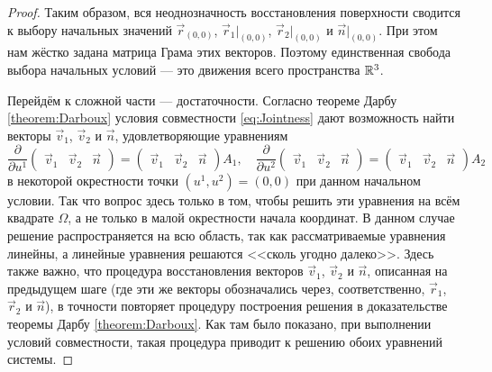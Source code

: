 \begin{proof}
	Таким образом, вся неоднозначность восстановления поверхности сводится к выбору начальных значений $\vec{r}_{(0, 0)}$, $\vec{r}_1|_{(0, 0)}$, $\vec{r}_2|_{(0, 0)}$ и $\vec{n}|_{(0, 0)}$. При этом нам жёстко задана матрица Грама этих векторов. Поэтому единственная свобода выбора начальных условий --- это движения всего пространства $\mathbb{R}^3$.

	Перейдём к сложной части --- достаточности. Согласно теореме Дарбу \eqref{theorem:Darboux} условия совместности \eqref{eq:Jointness} дают возможность найти векторы $\vec{v}_1$, $\vec{v}_2$ и $\vec{n}$, удовлетворяющие уравнениям
	\begin{equation} \label{eq:DerivativeMatrix}
		\frac{\partial}{\partial u^1}
		\begin{pmatrix}
			\vec{v}_1 & \vec{v}_2 & \vec{n}
		\end{pmatrix} =
		\begin{pmatrix}
			\vec{v}_1 & \vec{v}_2 & \vec{n}
		\end{pmatrix}A_1,\quad
		\frac{\partial}{\partial u^2}
		\begin{pmatrix}
			\vec{v}_1 & \vec{v}_2 & \vec{n}
		\end{pmatrix} =
		\begin{pmatrix}
			\vec{v}_1 & \vec{v}_2 & \vec{n}
		\end{pmatrix}A_2
	\end{equation}
	в некоторой окрестности точки $(u^1, u^2) = (0, 0)$ при данном начальном условии. Так что вопрос здесь только в том, чтобы решить эти уравнения на всём квадрате $\Omega$, а не только в малой окрестности начала координат. В данном случае решение распространяется на всю область, так как рассматриваемые уравнения линейны, а линейные уравнения решаются <<сколь угодно далеко>>. Здесь также важно, что процедура восстановления векторов $\vec{v}_1$, $\vec{v}_2$ и $\vec{n}$, описанная на предыдущем шаге (где эти же векторы обозначались через, соответственно, $\vec{r}_1$, $\vec{r}_2$ и $\vec{n}$), в точности повторяет процедуру построения решения в доказательстве теоремы Дарбу \ref{theorem:Darboux}. Как там было показано, при выполнении условий совместности, такая процедура приводит к решению обоих уравнений системы.


\end{proof}
